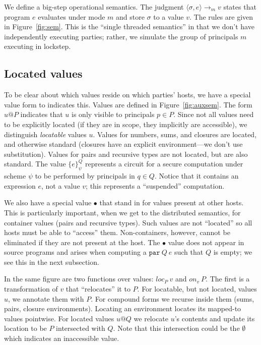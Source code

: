 \documentclass[10pt]{article}
\makeatletter
\newcommand{\kw}[1]{\ensuremath{\mathtt{#1}}}
\newcommand{\epar}[2]{\ensuremath{\kw{par}~{#1}~{#2}}}
\newcommand{\vshare}[3]{\ensuremath{\{{#3}\}^{#1}_{#2}}}
\newcommand{\vloc}[2]{\ensuremath{{#1}\kw{@}{#2}}}
\newcommand{\vcrash}{\ensuremath{\bullet}}
\newcommand{\eval}[4]{\ensuremath{\config{#1}{#3} \longrightarrow_{#2} {#4}}}
\newcommand{\env}{\ensuremath{\sigma}}
\newcommand{\config}[2]{\ensuremath{\langle{#1},{#2}\rangle}}
\newcommand{\locof}[2]{\ensuremath{\mathit{loc}_{#1}~{#2}}}
\newcommand{\getat}[2]{\ensuremath{\mathit{on}_{#1}~{#2}}}
\makeatother
\begin{document}
We define a big-step operational semantics. The judgment
$\eval{\env}{m}{e}{v}$ states that program
$e$ evaluates under mode $m$ and store $\env$ to a value
$v$. The rules are given in Figure~\ref{fig:sem}.  This is the
``single threaded semantics'' in that we don't have independently
executing parties; rather, we simulate the group of principals
$m$ executing in lockstep.

\subsection{Located values}

To be clear about which values reside on which parties' hosts, we have
a special value form to indicates this. Values are defined in
Figure~\ref{fig:auxsem}. The form $\vloc{u}{P}$ indicates that $u$ is
only visible to principals $p \in P$. Since not all values need to be
explicitly located (if they are in scope, they implicitly are
accessible), we distinguish \emph{locatable} values $u$.  Values for
numbers, sums, and closures are located, and otherwise standard
(closures have an explicit environment---we don't use
substitution). Values for pairs and recursive types are not located,
but are also standard. The value $\vshare{Q}{\psi}{e}$ represents a
circuit for a secure computation under scheme $\psi$ to be performed
by principals in $q \in Q$. Notice that it contains an expression $e$,
not a value $v$; this represents a ``suspended'' computation.

We also have a special value $\vcrash$ that stand in for values
present at other hosts. This is particularly important, when we get to
the distributed semantics, for container values (pairs and recursive
types). Such values are not ``located'' so all hosts must be able to
``access'' them. Non-containers, however, cannot be eliminated if they
are not present at the host. The $\vcrash$ value does not appear in
source programs and arises when computing a $\epar{Q}{e}$ such that
$Q$ is empty; we see this in the next subsection.

In the same figure are two functions over values: $\locof{P}{v}$ and
$\getat{v}{P}$. The first is a transformation of $v$ that
``relocates'' it to $P$. For locatable, but not located, values $u$,
we annotate them with $P$. For compound forms we recurse inside them
(sums, pairs, closure environments). Locating an environment locates
its mapped-to values pointwise.  For located values $\vloc{u}{Q}$ we
relocate $u$'s contents and update its location to be $P$ intersected
with $Q$. Note that this intersection could be the $\emptyset$ which
indicates an inaccessible value.
\end{document}
